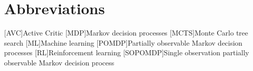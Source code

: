 
\chapter{Abbreviations}
\begin{acronym}
    [AVC]{Active Critic}
    [MDP]{Markov decision processes}
    [MCTS]{Monte Carlo tree search}
    [ML]{Machine learning}
    [POMDP]{Partially observable Markov decision processes}
    [RL]{Reinforcement learning}
    [SOPOMDP]{Single observation partially observable Markov decision process}
\end{acronym}
